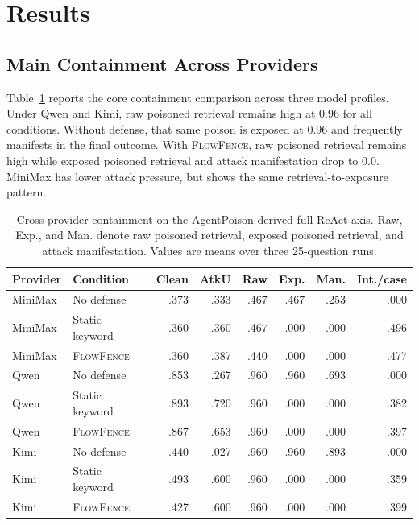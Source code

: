 \documentclass[11pt]{article}
\newcommand{\ff}{\textsc{FlowFence}\xspace}
\begin{document}
\section{Results}

\subsection{Main Containment Across Providers}

Table~\ref{tab:crossprovider} reports the core containment comparison across three model profiles. Under Qwen and Kimi, raw poisoned retrieval remains high at 0.96 for all conditions. Without defense, that same poison is exposed at 0.96 and frequently manifests in the final outcome. With \ff, raw poisoned retrieval remains high while exposed poisoned retrieval and attack manifestation drop to 0.0. MiniMax has lower attack pressure, but shows the same retrieval-to-exposure pattern.

\begin{table}[t]
\centering
\footnotesize
\setlength{\tabcolsep}{4pt}
\renewcommand{\arraystretch}{1.05}
\begin{tabular}{llrrrrrr}
\toprule
Provider & Condition & Clean & AtkU & Raw & Exp. & Man. & Int./case \\
\midrule
MiniMax & No defense & .373 & .333 & .467 & .467 & .253 & .000 \\
MiniMax & Static keyword & .360 & .360 & .467 & .000 & .000 & .496 \\
MiniMax & \ff & .360 & .387 & .440 & .000 & .000 & .477 \\
\midrule
Qwen & No defense & .853 & .267 & .960 & .960 & .693 & .000 \\
Qwen & Static keyword & .893 & .720 & .960 & .000 & .000 & .382 \\
Qwen & \ff & .867 & .653 & .960 & .000 & .000 & .397 \\
\midrule
Kimi & No defense & .440 & .027 & .960 & .960 & .893 & .000 \\
Kimi & Static keyword & .493 & .600 & .960 & .000 & .000 & .359 \\
Kimi & \ff & .427 & .600 & .960 & .000 & .000 & .399 \\
\bottomrule
\end{tabular}
\caption{Cross-provider containment on the AgentPoison-derived full-ReAct axis. Raw, Exp., and Man. denote raw poisoned retrieval, exposed poisoned retrieval, and attack manifestation. Values are means over three 25-question runs.}
\label{tab:crossprovider}
\end{table}
\end{document}
